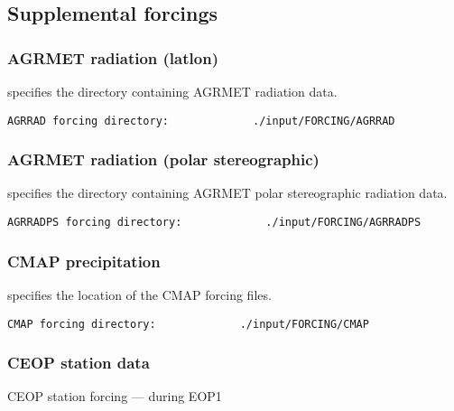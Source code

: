  
 \subsection{Supplemental forcings} \label{ssec:suppforcings}
 

 
 \subsubsection{AGRMET radiation (latlon)} \label{sssec:supp_agrrad}
  specifies the directory containing
 AGRMET radiation data.
 

 \begin{Verbatim}[frame=single]
AGRRAD forcing directory:             ./input/FORCING/AGRRAD
 \end{Verbatim}

 
 \subsubsection{AGRMET radiation (polar stereographic)}
 \label{sssec:supp_agrradps}
 

 
  specifies the directory containing
 AGRMET polar stereographic radiation data.
 

 \begin{Verbatim}[frame=single]
AGRRADPS forcing directory:             ./input/FORCING/AGRRADPS
 \end{Verbatim}


 
 \subsubsection{CMAP precipitation} \label{sssec:supp_cmap}
 

 
  specifies the location of the
 CMAP forcing files.
 

 \begin{Verbatim}[frame=single]
CMAP forcing directory:             ./input/FORCING/CMAP
 \end{Verbatim}

 
 \subsubsection{CEOP station data} \label{sssec:supp_ceop}
 CEOP station forcing --- during EOP1
 

